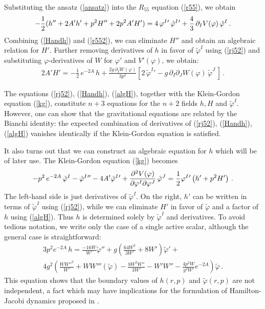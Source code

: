 \documentclass[a4paper,12pt]{article}
\def\varphit{\tilde{\varphi}}
\begin{document}
Substituting the ansatz (\ref{ansatz}) into the $R_{55}$
equation (\ref{r55}), we obtain
\begin{eqnarray}
\label{r552}
- {1 \over 2} (h'' + 2 A' h' + p^2 H'' + 2 p^2 A' H') = 4 \,
  \varphi^I{}' \, \tilde{\varphi}^I{}' + {4 \over 3} \, \partial_I
  V(\varphi) \, \tilde{\varphi}^I \,.
\end{eqnarray}
Combining (\ref{Handh}) and (\ref{r552}), we can eliminate $H''$ and
obtain an algebraic relation for $H'$.  Further removing derivatives
of $h$ in favor of $\varphit^I$ using (\ref{rj52}) and substituting
$\varphi$-derivatives of $W$ for $\varphi'$ and $V'(\varphi)$, we obtain:
\begin{eqnarray}
\label{algH}
2 A' H' = - \frac{1}{2} \, e^{-2A} \, h + \frac{2g \, \partial_I
W(\varphi)}{3 p^2} \left[ 2 \, \varphit^I{}' - g \, \partial_I
\partial_J W(\varphi) \, \varphit^J \, \right] \,.
\end{eqnarray}

The equations (\ref{rj52}), (\ref{Handh}), (\ref{algH}), together with
the Klein-Gordon equation (\ref{kg}), constitute $n+3$ equations for
the $n+2$ fields $h,H$ and $\varphit^I$.  However, one can show that
the gravitational equations are related by the Bianchi identity: the
expected combination of derivatives of (\ref{rj52}), (\ref{Handh}),
(\ref{algH}) vanishes identically if the Klein-Gordon equation is
satisfied.


It also turns out that we can construct an algebraic equation for $h$ 
which will be of later use.
The Klein-Gordon equation (\ref{kg}) becomes
\begin{eqnarray}
\label{kg2}
- p^2 \, e^{-2A}  \, \tilde{\varphi}^I - \tilde{\varphi}^I{}'' - 4 A' 
 \tilde{\varphi}^I{}' +  {\partial^2 V(\varphi) \over \partial \varphi^I \partial \varphi^J} 
  \,  \tilde{\varphi}^J = {1 \over 2} \varphi^I{}'
  \left( h' + p^2 H' \right)\,.
\end{eqnarray}
The left-hand side is just derivatives of $\varphit^I$.  On the right,
$h'$ can be written in terms of $\varphit^I$ using (\ref{rj52}), while
we can eliminate $H'$ in favor of $\varphit$ and a factor of $h$
using (\ref{algH}).  Thus $h$ is determined solely by $\varphit^I$ and
derivatives.  To avoid tedious notation, we write only the case of a
single active scalar, although the general case is straightforward:
\begin{eqnarray}
\label{algh}
 3 p^2 e^{-2A} \, h = \frac{-16 W} {W'}
\varphit'' + g \left( \frac{64 W^2}{3 W'} + 8
W' \right) \varphit' + \\ 4 g^2 \left( \frac{
W W''^2}{W'} +  W W'''(\varphit) - \frac{8 W^2
W''}{3W'} -  W'
W'' - \frac{4 p^2 W}{g^2 W'} e^{-2A}
\right) \varphit \,.
\nonumber
\end{eqnarray}
This equation shows that the boundary values of $h(r,p)$ and $\varphit(r,p)$
are not independent, a fact which may have implications for the formulation
of Hamilton-Jacobi dynamics proposed in \cite{dbvv}.
\end{document}
